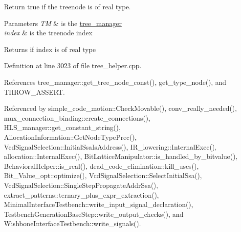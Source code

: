 Return true if the treenode is of real type. 


\begin{DoxyParams}{Parameters}
{\em TM} & is the \hyperlink{classtree__manager}{tree\+\_\+manager} \\
\hline
{\em index} & is the treenode index \\
\hline
\end{DoxyParams}
\begin{DoxyReturn}{Returns}
if index is of real type 
\end{DoxyReturn}


Definition at line 3023 of file tree\+\_\+helper.\+cpp.



References tree\+\_\+manager\+::get\+\_\+tree\+\_\+node\+\_\+const(), get\+\_\+type\+\_\+node(), and T\+H\+R\+O\+W\+\_\+\+A\+S\+S\+E\+RT.



Referenced by simple\+\_\+code\+\_\+motion\+::\+Check\+Movable(), conv\+\_\+really\+\_\+needed(), mux\+\_\+connection\+\_\+binding\+::create\+\_\+connections(), H\+L\+S\+\_\+manager\+::get\+\_\+constant\+\_\+string(), Allocation\+Information\+::\+Get\+Node\+Type\+Prec(), Vcd\+Signal\+Selection\+::\+Initial\+Ssa\+Is\+Address(), I\+R\+\_\+lowering\+::\+Internal\+Exec(), allocation\+::\+Internal\+Exec(), Bit\+Lattice\+Manipulator\+::is\+\_\+handled\+\_\+by\+\_\+bitvalue(), Behavioral\+Helper\+::is\+\_\+real(), dead\+\_\+code\+\_\+elimination\+::kill\+\_\+uses(), Bit\+\_\+\+Value\+\_\+opt\+::optimize(), Vcd\+Signal\+Selection\+::\+Select\+Initial\+Ssa(), Vcd\+Signal\+Selection\+::\+Single\+Step\+Propagate\+Addr\+Ssa(), extract\+\_\+patterns\+::ternary\+\_\+plus\+\_\+expr\+\_\+extraction(), Minimal\+Interface\+Testbench\+::write\+\_\+input\+\_\+signal\+\_\+declaration(), Testbench\+Generation\+Base\+Step\+::write\+\_\+output\+\_\+checks(), and Wishbone\+Interface\+Testbench\+::write\+\_\+signals().

